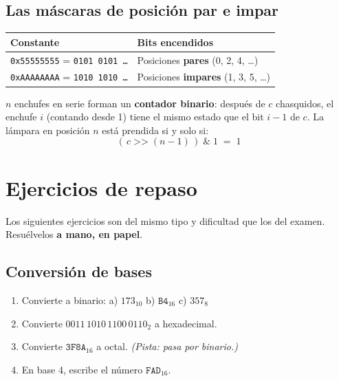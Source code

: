 \documentclass[12pt, oneside]{article}
\begin{document}
\subsection{Las máscaras de posición par e impar}

\begin{center}
\begin{tabular}{ll}
  \toprule
  \textbf{Constante} & \textbf{Bits encendidos} \\
  \midrule
  \texttt{0x55555555} = \texttt{0101 0101 \ldots} & Posiciones \textbf{pares} (0, 2, 4, \ldots) \\
  \texttt{0xAAAAAAAA} = \texttt{1010 1010 \ldots} & Posiciones \textbf{impares} (1, 3, 5, \ldots) \\
  \bottomrule
\end{tabular}
\end{center}

\begin{ejemplo}
  $n$ enchufes en serie forman un \textbf{contador binario}: después de $c$
  chasquidos, el enchufe $i$ (contando desde 1) tiene el mismo estado que el
  bit $i-1$ de $c$.  La lámpara en posición $n$ está prendida si y solo si:
  \[
    (\,c \;\texttt{>>}\; (n-1)\,) \;\texttt{\&}\; 1 \;=\; 1
  \]
\end{ejemplo}

\newpage

\section{Ejercicios de repaso}

Los siguientes ejercicios son del mismo tipo y dificultad que los del examen.
Resuélvelos \textbf{a mano, en papel}.

\subsection{Conversión de bases}

\begin{enumerate}
  \item Convierte a binario: \quad a) $173_{10}$ \quad b) $\mathtt{B4}_{16}$ \quad c) $357_8$
  \item Convierte $0011\,1010\,1100\,0110_2$ a hexadecimal.
  \item Convierte $\mathtt{3F8A}_{16}$ a octal. \textit{(Pista: pasa por binario.)}
  \item En base 4, escribe el número $\mathtt{FAD}_{16}$.
\end{enumerate}
\end{document}
